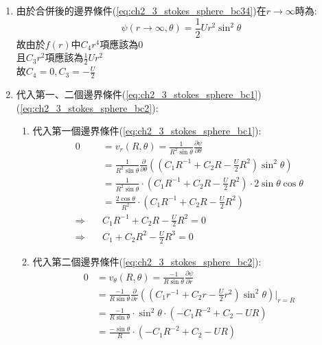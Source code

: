 \documentclass[../main.tex]{subfiles}
\begin{document}
\begin{itemize}
\begin{enumerate}
    \item 由於合併後的邊界條件(\ref{eq:ch2_3_stokes_sphere_bc34})在$r\to\infty$時為:
    \begin{equation}
      \psi(r\to\infty,\theta) = \frac{1}{2} U r^2 \sin^2\theta
    \end{equation}
    故由於$f(r)$中$C_4 r^4$項應該為0\\
    且$C_3 r^2$項應該為$\frac{1}{2} U r^2$\\
    故$C_4 = 0,C_3 = -\frac{U}{2}$
    \item 代入第一、二個邊界條件(\ref{eq:ch2_3_stokes_sphere_bc1})(\ref{eq:ch2_3_stokes_sphere_bc2}):
    \begin{enumerate}
      \item 代入第一個邊界條件(\ref{eq:ch2_3_stokes_sphere_bc1}):
      \begin{align}
        0 &= v_r(R,\theta) = \frac{1}{R^2\sin\theta}\frac{\partial \psi}{\partial \theta} \nonumber\\
        &= \frac{1}{R^2\sin\theta}\frac{\partial }{\partial \theta}\left(
          (C_1 R^{-1} + C_2 R - \frac{U}{2} R^2)\sin^2\theta
        \right) \nonumber\\
        &= \frac{1}{R^2\sin\theta} \cdot (C_1 R^{-1} + C_2 R - \frac{U}{2} R^2) \cdot 2\sin\theta \cos\theta \nonumber\\
        &= \frac{2\cos\theta}{R^2} \cdot (C_1 R^{-1} + C_2 R - \frac{U}{2} R^2) \nonumber\\
        \Rightarrow\quad & C_1 R^{-1} + C_2 R - \frac{U}{2} R^2 = 0 \nonumber\\
        \Rightarrow\quad & C_1 + C_2 R^2 - \frac{U}{2} R^3 = 0 \label{eq:ch2_3_stokes_sphere_bc1_sub}
      \end{align}
      \item 代入第二個邊界條件(\ref{eq:ch2_3_stokes_sphere_bc2}):
      \begin{align}
        0 &= v_\theta(R,\theta) = \frac{-1}{R\sin\theta}\frac{\partial \psi}{\partial r} \nonumber\\
        &= \frac{-1}{R\sin\theta}\frac{\partial }{\partial r}\left(
          (C_1 r^{-1} + C_2 r - \frac{U}{2} r^2)\sin^2\theta
        \right) \bigg|_{r=R} \nonumber\\
        &= \frac{-1}{R\sin\theta} \cdot \sin^2\theta \cdot \left(
          -C_1 R^{-2} + C_2 - U R
        \right) \nonumber\\
        &= \frac{-\sin\theta}{R} \cdot \left(
          -C_1 R^{-2} + C_2 - U R
        \right) \nonumber\\

\end{align}
\end{enumerate}
\end{enumerate}
\end{itemize}
\end{document}
